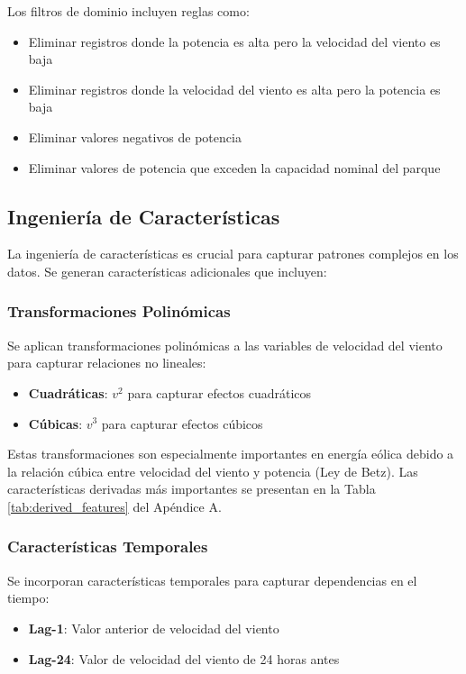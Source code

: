 \documentclass[conference]{IEEEtran}
\begin{document}
	Los filtros de dominio incluyen reglas como:
	\begin{itemize}
		\item Eliminar registros donde la potencia es alta pero la velocidad del viento es baja
		\item Eliminar registros donde la velocidad del viento es alta pero la potencia es baja
		\item Eliminar valores negativos de potencia
		\item Eliminar valores de potencia que exceden la capacidad nominal del parque
	\end{itemize}
	
	\subsection{Ingeniería de Características}
	La ingeniería de características es crucial para capturar patrones complejos en los datos. Se generan características adicionales que incluyen:
	
	\subsubsection{Transformaciones Polinómicas}
	Se aplican transformaciones polinómicas a las variables de velocidad del viento para capturar relaciones no lineales:
	\begin{itemize}
		\item \textbf{Cuadráticas}: $v^2$ para capturar efectos cuadráticos
		\item \textbf{Cúbicas}: $v^3$ para capturar efectos cúbicos
	\end{itemize}
	
	Estas transformaciones son especialmente importantes en energía eólica debido a la relación cúbica entre velocidad del viento y potencia (Ley de Betz). Las características derivadas más importantes se presentan en la Tabla \ref{tab:derived_features} del Apéndice A.
	
	\subsubsection{Características Temporales}
	Se incorporan características temporales para capturar dependencias en el tiempo:
	\begin{itemize}
		\item \textbf{Lag-1}: Valor anterior de velocidad del viento
		\item \textbf{Lag-24}: Valor de velocidad del viento de 24 horas antes
	\end{itemize}
	
\end{document}
